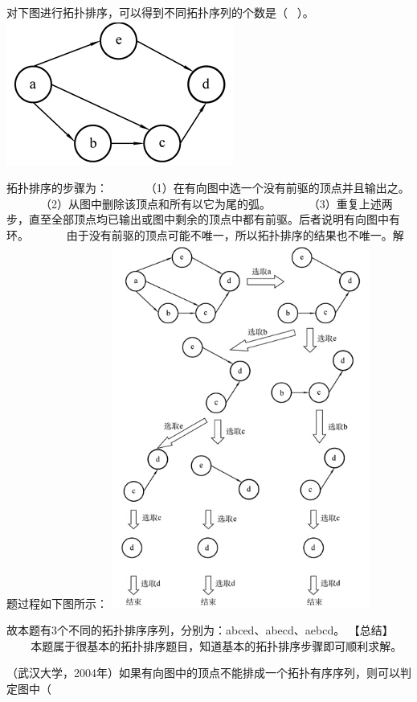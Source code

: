 \question 对下图进行拓扑排序，可以得到不同拓扑序列的个数是（ ~）。
\includegraphics[width=2.93750in,height=1.87500in]{computerassets/47e0ad54c481720d18a9c25b7cc54696.jpeg}
\par{}
\begin{solution}拓扑排序的步骤为： ~ ~ ~
~（1）在有向图中选一个没有前驱的顶点并且输出之。 ~ ~ ~
~（2）从图中删除该顶点和所有以它为尾的弧。 ~ ~ ~
~（3）重复上述两步，直至全部顶点均已输出或图中剩余的顶点中都有前驱。后者说明有向图中有环。
~ ~ ~
~由于没有前驱的顶点可能不唯一，所以拓扑排序的结果也不唯一。解题过程如下图所示：
\includegraphics[width=3.33333in,height=4.71875in]{computerassets/b2de19171affe09b50c14eeca59f9f21.jpeg}

故本题有3个不同的拓扑排序序列，分别为：abced、abecd、aebcd。 【总结】 ~
~ ~ ~本题属于很基本的拓扑排序题目，知道基本的拓扑排序步骤即可顺利求解。
\end{solution}
\question （武汉大学，2004年）如果有向图中的顶点不能排成一个拓扑有序序列，则可以判定图中（
